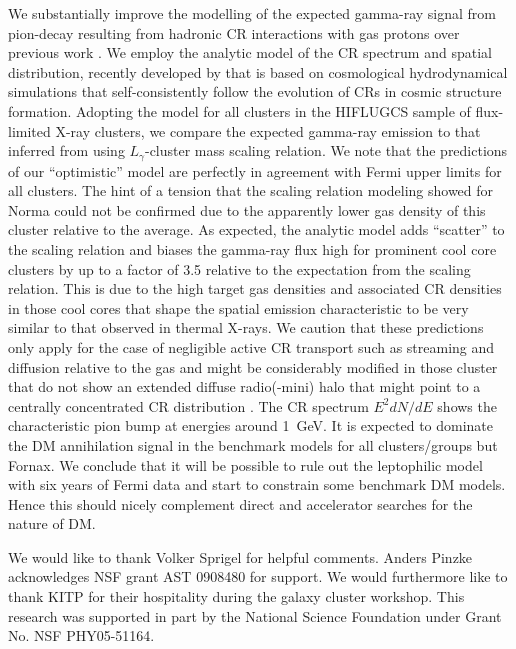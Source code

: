 \documentclass[10pt,aps,pra,reprint,amsmath,amsfonts,amssymb,showpacs,nofootinbib,floatfix]{revtex4-1}
\begin{document}
We substantially improve the modelling of the expected gamma-ray
signal from pion-decay resulting from hadronic CR interactions with
gas protons over previous work \citep{2010ApJ...717L..71A}. We employ
the analytic model of the CR spectrum and spatial distribution,
recently developed by \citet{2010MNRAS.409..449P} that is based on
cosmological hydrodynamical simulations that self-consistently follow
the evolution of CRs in cosmic structure formation. Adopting the model
for all clusters in the HIFLUGCS sample of flux-limited X-ray
clusters, we compare the expected gamma-ray emission to that inferred
from using $L_\gamma$-cluster mass scaling relation. We note that the
predictions of our ``optimistic'' model are perfectly in agreement
with Fermi upper limits for all clusters.  The hint of a tension that
the scaling relation modeling showed for Norma
\citep{2010ApJ...717L..71A} could not be confirmed due to the
apparently lower gas density of this cluster relative to the average.
As expected, the analytic model adds ``scatter'' to the scaling
relation and biases the gamma-ray flux high for prominent cool core
clusters by up to a factor of 3.5 relative to the expectation from the
scaling relation. This is due to the high target gas densities and
associated CR densities in those cool cores that shape the spatial
emission characteristic to be very similar to that observed in thermal
X-rays. We caution that these predictions only apply for the case of
negligible active CR transport such as streaming and diffusion
relative to the gas and might be considerably modified in those
cluster that do not show an extended diffuse radio(-mini) halo that
might point to a centrally concentrated CR distribution
\citep{2011A&A...527A..99E}. The CR spectrum $E^2 dN/dE$ shows the
characteristic pion bump at energies around 1~GeV. It is expected to
dominate the DM annihilation signal in the benchmark models for all
clusters/groups but Fornax. We conclude that it will be possible to
rule out the leptophilic model with six years of Fermi data and start
to constrain some benchmark DM models. Hence this should nicely
complement direct and accelerator searches for the nature of DM.






\smallskip We would like to thank Volker Sprigel for helpful comments.
Anders Pinzke acknowledges NSF grant AST 0908480 for
support. We would furthermore like to thank KITP for their hospitality
during the galaxy cluster workshop.  This research was supported in
part by the National Science Foundation under Grant No. NSF
PHY05-51164.
\end{document}
